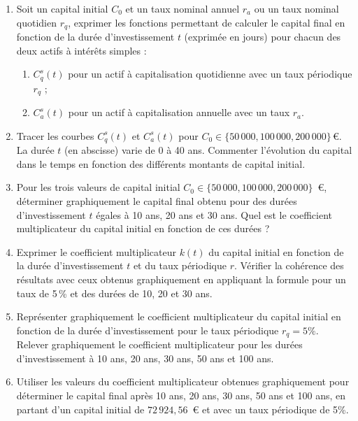 \documentclass{article}
\begin{document}
\begin{enumerate}[label=\textbf{Q1.\arabic*}]
    \item Soit un capital initial \( C_0 \) et un taux nominal annuel \( r_a \) ou un taux nominal quotidien \( r_q \), exprimer les fonctions permettant de calculer le capital final en fonction de la durée d'investissement \( t \) (exprimée en jours) pour chacun des deux actifs à intérêts simples :
          \begin{enumerate}[label=(\alph*)]
              \item \( C^s_q(t) \) pour un actif à capitalisation quotidienne avec un taux périodique \( r_q \) ;
              \item \( C^s_a(t) \) pour un actif à capitalisation annuelle avec un taux \( r_a \).
          \end{enumerate}
          
    \item Tracer les courbes \( C^s_q(t) \) et \( C^s_a(t) \) pour \( C_0 \in \{50\,000, 100\,000, 200\,000\} \, \text{€} \). La durée \( t \) (en abscisse) varie de 0 à 40 ans. Commenter l'évolution du capital dans le temps en fonction des différents montants de capital initial.
          
    \item Pour les trois valeurs de capital initial \( C_0 \in \{50\,000, 100\,000, 200\,000\} \)~€, déterminer graphiquement le capital final obtenu pour des durées d'investissement \( t \) égales à 10 ans, 20 ans et 30 ans. Quel est le coefficient multiplicateur du capital initial en fonction de ces durées ?
          
    \item Exprimer le coefficient multiplicateur \( k(t) \) du capital initial en fonction de la durée d'investissement \( t \) et du taux périodique \( r \). Vérifier la cohérence des résultats avec ceux obtenus graphiquement en appliquant la formule pour un taux de 5\,\% et des durées de 10, 20 et 30 ans.
          
    \item Représenter graphiquement le coefficient multiplicateur du capital initial en fonction de la durée d'investissement pour le taux périodique $r_q = 5\%$. Relever graphiquement le coefficient multiplicateur pour les durées d'investissement à 10 ans, 20 ans, 30 ans, 50 ans et 100 ans.
          
    \item Utiliser les valeurs du coefficient multiplicateur obtenues graphiquement pour déterminer le capital final après 10 ans, 20 ans, 30 ans, 50 ans et 100 ans, en partant d'un capital initial de $72\,924,56$\ € et avec un taux périodique de 5\%.
          

\end{enumerate}
\end{document}
